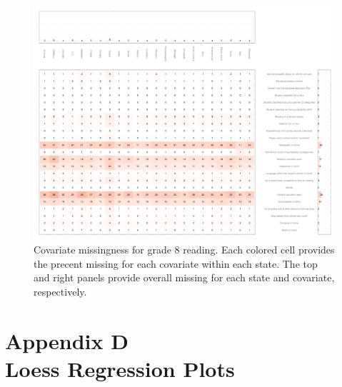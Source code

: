 \begin{figure}[h]
\begin{center}
\includegraphics[width=\textwidth]{../Figures2009/g8read-missing.pdf}
\caption[Covariate missingness for grade 8 reading]{Covariate missingness for grade 8 reading. Each colored cell provides the precent missing for each covariate within each state. The top and right panels provide overall missing for each state and covariate, respectively.}
\label{fig:g8reading:missing}
\end{center}
\end{figure}


\clearpage
{}
\section*{Appendix D\\Loess Regression Plots}
\label{appendixD}

